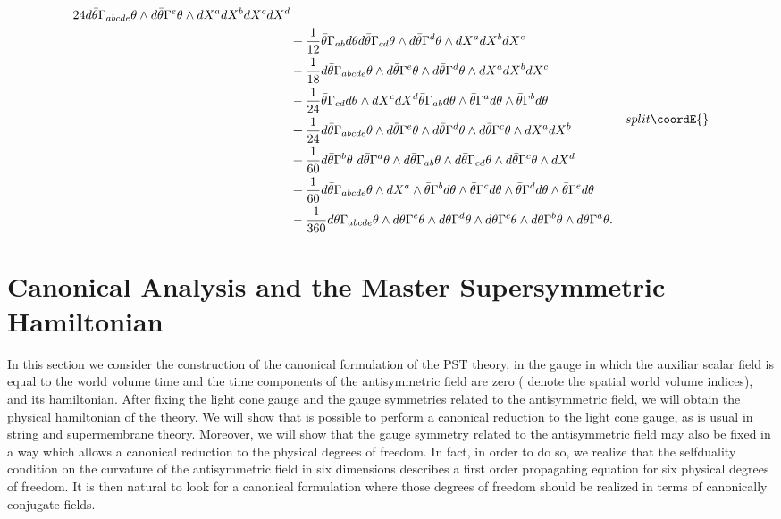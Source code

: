 \documentclass[a4paper,12pt]{article}
\def\btheta{\bar{\theta}}
\begin{document}
\begin{equation*}
{\begin{split}
{24}d\btheta\Gamma_{abcde}\theta\wedge d\btheta\Gamma^e\theta\wedge
dX^adX^bdX^cdX^d\\ &+ {1\over 12} \btheta\Gamma_{ab}d\theta
d\btheta\Gamma_{cd}\theta\wedge d\btheta\Gamma^d\theta\wedge
dX^adX^bdX^c
\\&-{1\over 18} d\btheta\Gamma_{abcde}\theta\wedge
d\btheta\Gamma^e\theta\wedge d\btheta\Gamma^d\theta\wedge
dX^adX^bdX^c\\ &- {1\over 24}\btheta\Gamma_{cd}d\theta\wedge
dX^cdX^d \btheta\Gamma_{ab}d\theta\wedge
\btheta\Gamma^ad\theta\wedge \btheta\Gamma^bd\theta \\&+{1\over
24}d\btheta\Gamma_{abcde}\theta\wedge d\btheta\Gamma^e\theta\wedge
d\btheta\Gamma^d\theta\wedge d\btheta\Gamma^c\theta\wedge
dX^adX^b\\ &+{1\over 60}d\btheta\Gamma^b\theta\
d\btheta\Gamma^a\theta \wedge d\btheta\Gamma_{ab}\theta \wedge
d\btheta\Gamma_{cd}\theta \wedge d\btheta\Gamma^c\theta \wedge
dX^d\\&+{1\over 60}d\btheta\Gamma_{abcde}\theta\wedge dX^a\wedge
\btheta\Gamma^bd\theta\wedge \btheta\Gamma^cd\theta \wedge
\btheta\Gamma^dd\theta\wedge \btheta\Gamma^ed\theta\\&-{1\over
360}d\btheta\Gamma_{abcde}\theta\wedge
d\btheta\Gamma^{e}\theta\wedge d\btheta\Gamma^{d}\theta\wedge
d\btheta\Gamma^{c}\theta\wedge d\btheta\Gamma^{b}\theta\wedge
d\btheta\Gamma^{a}\theta.
\end{split}
}{split}\coordE{}\end{equation*}

\section{Canonical Analysis and the Master Supersymmetric Hamiltonian}
In this section we consider the construction of the canonical
formulation of the PST theory, in the gauge in which the auxiliar
scalar field \myHighlight{$a$}\coordHE{} is equal to the world volume time and the time
components of the antisymmetric field \myHighlight{$B_{0\mu}$}\coordHE{} are zero
(\myHighlight{$\mu=1,\cdots, 5$}\coordHE{} denote the spatial world volume indices), and
its hamiltonian. After fixing the light cone gauge and the gauge
symmetries related to the antisymmetric field, we will obtain the
physical hamiltonian of the theory. We will show that is possible
to perform a canonical reduction to the light cone gauge, as is
usual in string and supermembrane theory. Moreover, we will show
that the gauge symmetry related to the antisymmetric field may
also be fixed in a way which allows a canonical reduction to the
physical degrees of freedom. In fact, in order to do so, we
realize that the selfduality condition on the curvature of the
antisymmetric field in six dimensions describes a first order
propagating equation for six physical degrees of freedom. It is
then natural to look for a canonical formulation where those
degrees of freedom should be realized in terms of canonically
conjugate fields.
\end{document}
